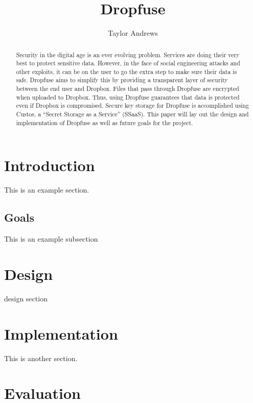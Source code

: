 \documentclass[11pt,twocolumn,letterpaper]{article}
\newcommand{\appname}{Dropfuse }
\begin{document}
\title{\appname}

\author{Taylor Andrews}

\maketitle

\begin{abstract}
Security in the digital age is an ever evolving problem.
Services are doing their very best to protect sensitive data. 
However, in the face of social engineering attacks and other 
exploits, it can be on the user to go the extra step to make sure
their data is safe. \appname aims to simplify this by providing a
transparent layer of security between the end user and Dropbox. Files
that pass through \appname are encrypted when uploaded to Dropbox. 
Thus, using \appname guarantees that data is protected even if 
Dropbox is compromised. Secure key storage for \appname is accomplished using
 Custos, a ``Secret Storage as a Service'' (SSaaS). 
This paper will lay out the design and 
implementation of \appname as well as future goals for the project.    
\end{abstract}

\section{Introduction}
\label{sec:intro}

This is an example section.

\subsection{Goals}
\label{sec:goals}

This is an example subsection

\section{Design}
\label{sec:design}

design section

\section{Implementation}
\label{sec:implementation}

This is another section.

\section{Evaluation}
\label{sec:eval}
\end{document}
